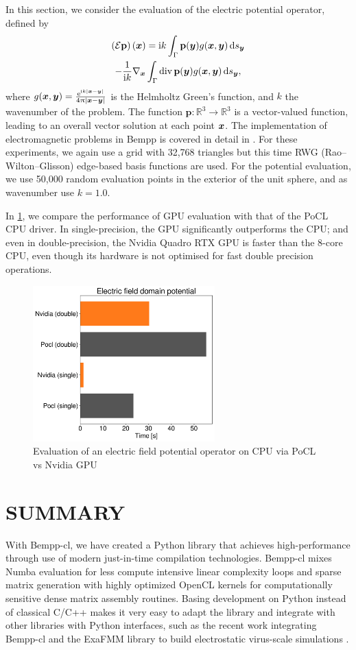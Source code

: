 In this section, we consider the evaluation of the electric potential operator, defined by
\begin{multline}
\left(\mathcal{E}\mathbf{p}\right)(\bx) = \ii k\int_{\Gamma}\mathbf{p}(\by)g(\bx, \by) \ds[\by]\\
-\frac{1}{\ii k}\nabla_{\bx}\int_{\Gamma}\operatorname{div}\mathbf{p}(\by)g(\bx, \by)\ds[\by],
\end{multline}
where $g(\boldsymbol{x}, \boldsymbol{y}) = \frac{\mathrm{e}^{\mathrm{i} k|\boldsymbol{x} - \boldsymbol{y}|}}{4\uppi|\boldsymbol{x} - \boldsymbol{y}|}$ is the Helmholtz Green's function, and
$k$ the wavenumber of the problem.
The function $\mathbf{p}:\mathbb{R}^3\to\mathbb{R}^3$ is a vector-valued function, leading to an overall vector solution at each point $\boldsymbol{x}$. The implementation of electromagnetic problems in Bempp is covered in detail in \cite{bempp_maxwell}. For these experiments, we again use a grid with 32,768 triangles but this time RWG (Rao--Wilton--Glisson) edge-based basis functions are used. For the potential evaluation, we use 50,000 random evaluation points in the exterior of the unit sphere, and as wavenumber use $k=1.0$.

In \cref{fig:efield_domain_potential}, we compare the performance of GPU evaluation with that of the PoCL CPU driver. In single-precision, the GPU significantly outperforms the CPU; and even in double-precision, the Nvidia Quadro RTX GPU is faster than the 8-core CPU, even though its hardware is not optimised for fast double precision operations.

\begin{figure}
	\center
	\includegraphics[width=7cm]{img/efield_domain_potential.pdf}
	\caption{Evaluation of an electric field potential operator on CPU via PoCL vs Nvidia GPU}
	\label{fig:efield_domain_potential}
\end{figure}

\section{SUMMARY}
With Bempp-cl, we have created a Python library that achieves high-performance through use of modern just-in-time compilation technologies. Bempp-cl mixes Numba evaluation for less compute intensive linear complexity loops and sparse matrix generation with highly optimized OpenCL kernels for computationally sensitive dense matrix assembly routines. Basing development on Python instead of classical C/C++ makes it very easy to adapt the library and integrate with other libraries with Python interfaces, such as the recent work integrating Bempp-cl and the ExaFMM library to build electrostatic virus-scale simulations \cite{bempp_exafmm}.

